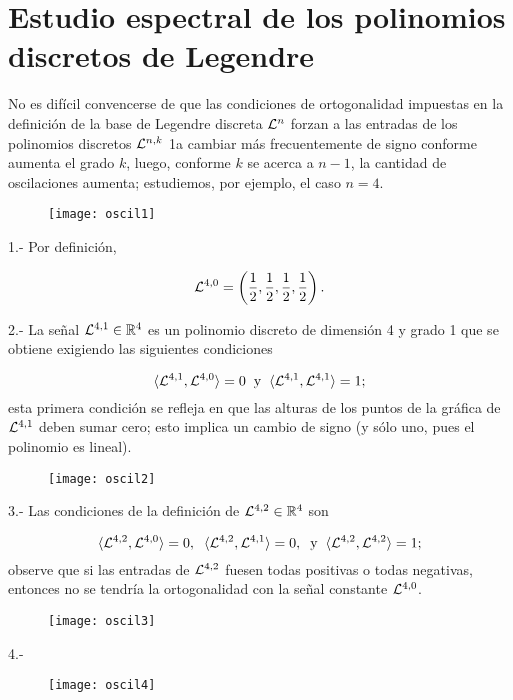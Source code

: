 \section{Estudio espectral de los polinomios discretos de Legendre}

No es difícil convencerse de que las condiciones de ortogonalidad
impuestas en la definición de la base de Legendre discreta
$\mathcal{L}^{n}$
forzan a las entradas de los polinomios discretos $\mathcal{L}^{n,k}$
1a cambiar más frecuentemente de signo conforme aumenta
el grado $k$, luego, conforme $k$ se acerca a $n-1$,
la cantidad de oscilaciones aumenta; estudiemos, 
por ejemplo, el caso $n=4$.

\begin{minipage}{0.5\textwidth}
\begin{figure}[H]
\texttt{[image: oscil1]}
\end{figure}
\end{minipage} \hfill
\begin{minipage}{0.45\textwidth}

1.- Por definición,

\[
\mathcal{L}^{4,0} = \left(
\frac{1}{2}, \frac{1}{2}, \frac{1}{2}, \frac{1}{2}
\right).
\]
\end{minipage}


\begin{minipage}{0.5\textwidth}
2.- La señal $\mathcal{L}^{4,1} \in \mathbb{R}^{4}$ es un polinomio discreto de
dimensión 4 y grado 1 que se obtiene exigiendo las
siguientes condiciones

\[
\langle \mathcal{L}^{4,1} , \mathcal{L}^{4,0} \rangle=0
\hspace{0.2cm} \text{y} \hspace{0.2cm}
\langle \mathcal{L}^{4,1} , \mathcal{L}^{4,1} \rangle=1;
\]
esta primera condición se refleja en que 
las alturas de los puntos de la gráfica de 
$\mathcal{L}^{4,1}$ deben sumar cero;
esto implica un cambio de signo (y sólo uno,
pues el polinomio es lineal).

\end{minipage} \hfill
\begin{minipage}{0.45\textwidth}
\begin{figure}[H]
\texttt{[image: oscil2]}
\end{figure}
\end{minipage}

3.- Las condiciones de la definición
de $\mathcal{L}^{4,2} \in \mathbb{R}^{4}$ son

\[
\langle \mathcal{L}^{4,2} , \mathcal{L}^{4,0} \rangle=0,
\hspace{0.2cm}
\langle \mathcal{L}^{4,2} , \mathcal{L}^{4,1} \rangle=0,
\hspace{0.2cm} \text{y} \hspace{0.2cm}
\langle \mathcal{L}^{4,2} , \mathcal{L}^{4,2} \rangle=1;
\]
observe que si las entradas de 
$\mathcal{L}^{4,2}$ fuesen todas positivas o todas negativas,
entonces no se tendría la ortogonalidad
con la señal constante $\mathcal{L}^{4,0}$. 


\begin{figure}[H]
\texttt{[image: oscil3]}
\end{figure}

4.- 
\begin{figure}[H]
\texttt{[image: oscil4]}
\end{figure}